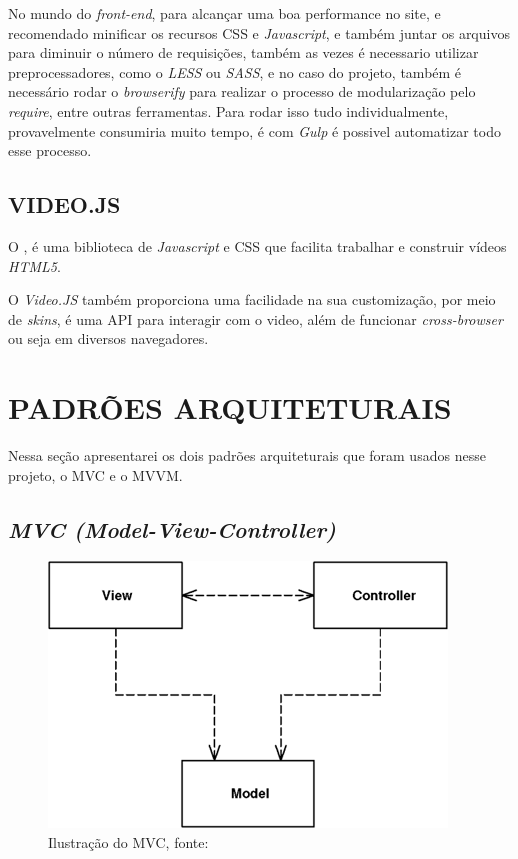 No mundo do \textit{front-end}, para alcançar uma boa performance no site, e recomendado minificar os recursos \ac{CSS} e \textit{Javascript}, e também juntar os arquivos para diminuir o número de requisições, também as vezes é necessario utilizar preprocessadores, como o \textit{LESS} ou \textit{SASS}, e no caso do projeto, também é necessário rodar o \textit{browserify} para realizar o processo de modularização pelo \textit{require}, entre outras ferramentas. Para rodar isso tudo individualmente, provavelmente consumiria muito tempo, é com \textit{Gulp} é possivel automatizar todo esse processo.

\subsection{VIDEO.JS}
O , é uma biblioteca de \textit{Javascript} e \ac{CSS} que facilita trabalhar e construir vídeos \textit{HTML5}.

O \textit{Video.JS} também proporciona uma facilidade na sua customização, por meio de \textit{skins}, é uma \ac{API} para interagir com o video, além de funcionar \textit{cross-browser} ou seja em diversos navegadores.

\newpage
\section{PADRÕES ARQUITETURAIS}
Nessa seção apresentarei os dois padrões arquiteturais que foram usados nesse projeto, o \ac{MVC} e o \ac{MVVM}.

\subsection{\textit{MVC (Model-View-Controller)}}
    \begin{figure}[h]
        \centering
        \includegraphics[keepaspectratio=true,scale=0.7]{figuras/mvc-fowler.png}
        \caption{Ilustração do \ac{MVC}, fonte: \cite{martin_fowler_patterns}}
        \label{fig:mvc-fowler}
    \end{figure}


